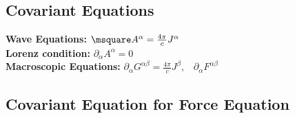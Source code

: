 \documentclass[a4paper, 11pt, landscape]{article}
\begin{document}
\begin{multicols*}{3}
\subsection{Covariant Equations}
\begin{compactenum}
    \textbf{Wave Equations:} $ \msquare A^{\alpha} = \frac{4 \pi}{c} J^{\alpha}$ \\
   \textbf{Lorenz condition:} $\partial_{\alpha}A^{\alpha} = 0$ \\
   \textbf{Macroscopic Equations:} $\partial_{\alpha}G^{\alpha \beta} = \frac{4 \pi}{c} J^{\beta}, \;\;\; \partial_{\alpha}F^{\alpha \beta}$
\end{compactenum}

\subsection{Covariant Equation for Force Equation}
\begin{compactenum}
    $\frac{dp^[\alpha}}{d\tau} = m \frac{dU^{\alpha}}{d\tau} = \frac{q}{c}F^{\alpha \beta} U_{\beta}$
\end{compactenum}

\raggedcolumns
\end{multicols*}
\end{document}
